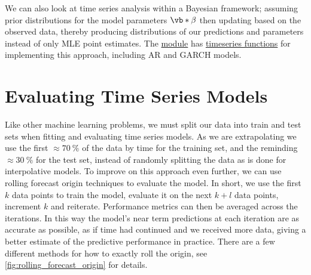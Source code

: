We can also look at time series analysis within a Bayesian framework;
assuming prior distributions for the model parameters $\vb*{\beta}$
then updating based on the observed data,
thereby producing distributions of our predictions and parameters instead of only MLE point estimates.
The \pymcThree \href{https://docs.pymc.io}{module}
has \href{https://docs.pymc.io/api/distributions/timeseries.html}{timeseries functions}
for implementing this approach, including AR and GARCH models.

\section{Evaluating Time Series Models}
\label{time_series:eval}

Like other machine learning problems, we must split our data into train and test sets
when fitting and evaluating time series models.
As we are extrapolating we use the first
$\approx \SI{70}{\percent}$ of the data by time for the training set,
and the reminding $\approx \SI{30}{\percent}$ for the test set,
instead of randomly splitting the data as is done for interpolative models.
To improve on this approach even further, we can use
rolling forecast origin techniques to evaluate the model.
In short, we use the first $k$ data points to train the model,
evaluate it on the next $k + l$ data points, increment $k$ and reiterate.
Performance metrics can then be averaged across the iterations.
In this way the model's near term predictions at each iteration are as accurate as possible,
as if time had continued and we received more data,
giving a better estimate of the predictive performance in practice.
There are a few different methods for how to exactly roll the origin,
see \cref{fig:rolling_forecast_origin} for details.

